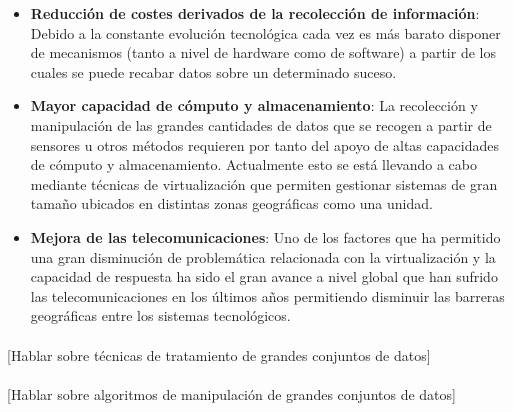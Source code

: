 \documentclass{subfiles}
\begin{document}
    \begin{itemize}

      \item \textbf{Reducción de costes derivados de la recolección de información}: Debido a la constante evolución tecnológica cada vez es más barato disponer de mecanismos (tanto a nivel de hardware como de software) a partir de los cuales se puede recabar datos sobre un determinado suceso.

      \item \textbf{Mayor capacidad de cómputo y almacenamiento}: La recolección y manipulación de las grandes cantidades de datos que se recogen a partir de sensores u otros métodos requieren por tanto del apoyo de altas capacidades de cómputo y almacenamiento. Actualmente esto se está llevando a cabo mediante técnicas de virtualización que permiten gestionar sistemas de gran tamaño ubicados en distintas zonas geográficas como una unidad.

      \item \textbf{Mejora de las telecomunicaciones}: Uno de los factores que ha permitido una gran disminución de problemática relacionada con la virtualización y la capacidad de respuesta ha sido el gran avance a nivel global que han sufrido las telecomunicaciones en los últimos años permitiendo disminuir las barreras geográficas entre los sistemas tecnológicos.

    \end{itemize}

  \paragraph{}
  [Hablar sobre técnicas de tratamiento de grandes conjuntos de datos]

  \paragraph{}
  [Hablar sobre algoritmos de manipulación de grandes conjuntos de datos]
\end{document}
